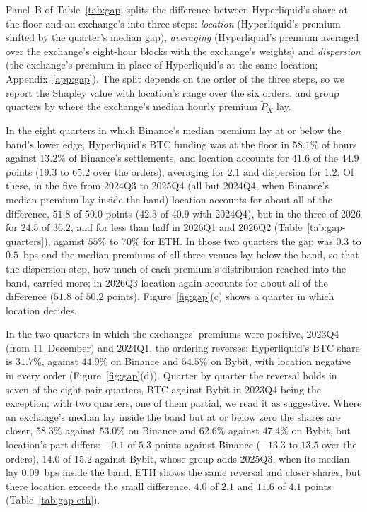 \documentclass[10pt,a4paper]{article}
\begin{document}
Panel~B of Table~\ref{tab:gap} splits the difference between Hyperliquid's share at the floor and an exchange's into three steps: \emph{location} (Hyperliquid's premium shifted by the quarter's median gap), \emph{averaging} (Hyperliquid's premium averaged over the exchange's eight-hour blocks with the exchange's weights) and \emph{dispersion} (the exchange's premium in place of Hyperliquid's at the same location; Appendix~\ref{app:gap}). The split depends on the order of the three steps, so we report the Shapley value with location's range over the six orders, and group quarters by where the exchange's median hourly premium $\tilde P_X$ lay.

In the eight quarters in which Binance's median premium lay at or below the band's lower edge, Hyperliquid's BTC funding was at the floor in $58.1\%$ of hours against $13.2\%$ of Binance's settlements, and location accounts for $41.6$ of the $44.9$ points ($19.3$ to $65.2$ over the orders), averaging for $2.1$ and dispersion for $1.2$. Of these, in the five from 2024Q3 to 2025Q4 (all but 2024Q4, when Binance's median premium lay inside the band) location accounts for about all of the difference, $51.8$ of $50.0$ points ($42.3$ of $40.9$ with 2024Q4), but in the three of 2026 for $24.5$ of $36.2$, and for less than half in 2026Q1 and 2026Q2 (Table~\ref{tab:gap-quarters}), against $55\%$ to $70\%$ for ETH. In those two quarters the gap was $0.3$ to $0.5$~bps and the median premiums of all three venues lay below the band, so that the dispersion step, how much of each premium's distribution reached into the band, carried more; in 2026Q3 location again accounts for about all of the difference ($51.8$ of $50.2$ points). Figure~\ref{fig:gap}(c) shows a quarter in which location decides.

In the two quarters in which the exchanges' premiums were positive, 2023Q4 (from 11~December) and 2024Q1, the ordering reverses: Hyperliquid's BTC share is $31.7\%$, against $44.9\%$ on Binance and $54.5\%$ on Bybit, with location negative in every order (Figure~\ref{fig:gap}(d)). Quarter by quarter the reversal holds in seven of the eight pair-quarters, BTC against Bybit in 2023Q4 being the exception; with two quarters, one of them partial, we read it as suggestive. Where an exchange's median lay inside the band but at or below zero the shares are closer, $58.3\%$ against $53.0\%$ on Binance and $62.6\%$ against $47.4\%$ on Bybit, but location's part differs: $-0.1$ of $5.3$ points against Binance ($-13.3$ to $13.5$ over the orders), $14.0$ of $15.2$ against Bybit, whose group adds 2025Q3, when its median lay $0.09$~bps inside the band. ETH shows the same reversal and closer shares, but there location exceeds the small difference, $4.0$ of $2.1$ and $11.6$ of $4.1$ points (Table~\ref{tab:gap-eth}).
\end{document}
